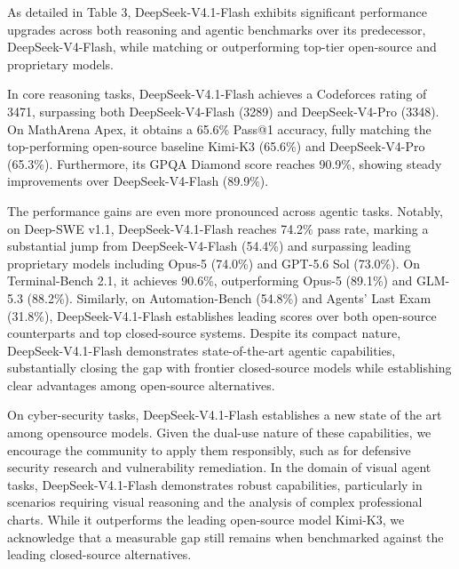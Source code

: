 \documentclass[
  10
]{article}
\begin{document}
As detailed in Table 3, DeepSeek-V4.1-Flash exhibits significant
performance upgrades across both reasoning and agentic benchmarks over
its predecessor, DeepSeek-V4-Flash, while matching or outperforming
top-tier open-source and proprietary models.

In core reasoning tasks, DeepSeek-V4.1-Flash achieves a Codeforces
rating of 3471, surpassing both DeepSeek-V4-Flash (3289) and
DeepSeek-V4-Pro (3348). On MathArena Apex, it obtains a 65.6\% Pass@1
accuracy, fully matching the top-performing open-source baseline Kimi-K3
(65.6\%) and DeepSeek-V4-Pro (65.3\%). Furthermore, its GPQA Diamond
score reaches 90.9\%, showing steady improvements over DeepSeek-V4-Flash
(89.9\%).

The performance gains are even more pronounced across agentic tasks.
Notably, on Deep-SWE v1.1, DeepSeek-V4.1-Flash reaches 74.2\% pass rate,
marking a substantial jump from DeepSeek-V4-Flash (54.4\%) and
surpassing leading proprietary models including Opus-5 (74.0\%) and
GPT-5.6 Sol (73.0\%). On Terminal-Bench 2.1, it achieves 90.6\%,
outperforming Opus-5 (89.1\%) and GLM-5.3 (88.2\%). Similarly, on
Automation-Bench (54.8\%) and Agents' Last Exam (31.8\%),
DeepSeek-V4.1-Flash establishes leading scores over both open-source
counterparts and top closed-source systems. Despite its compact nature,
DeepSeek-V4.1-Flash demonstrates state-of-the-art agentic capabilities,
substantially closing the gap with frontier closed-source models while
establishing clear advantages among open-source alternatives.

On cyber-security tasks, DeepSeek-V4.1-Flash establishes a new state of
the art among opensource models. Given the dual-use nature of these
capabilities, we encourage the community to apply them responsibly, such
as for defensive security research and vulnerability remediation. In the
domain of visual agent tasks, DeepSeek-V4.1-Flash demonstrates robust
capabilities, particularly in scenarios requiring visual reasoning and
the analysis of complex professional charts. While it outperforms the
leading open-source model Kimi-K3, we acknowledge that a measurable gap
still remains when benchmarked against the leading closed-source
alternatives.
\end{document}
